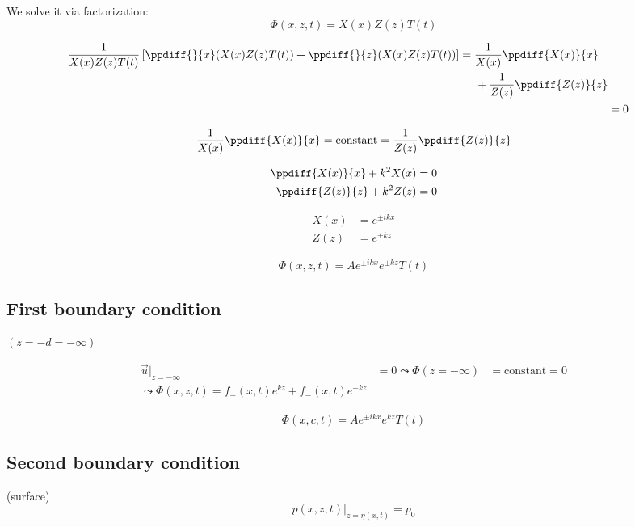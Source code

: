 We solve it via factorization:
\begin{equation}
\Phi(x,z,t)=X(x)Z(z)T(t)
\end{equation}

\begin{align}
\begin{split}
\frac{1}{X(x)Z(z)T(t)}  \left[ \ppdiff{}{x}(X(x)Z(z)T(t)) + \ppdiff{}{z}(X(x)Z(z)T(t))\right] &=  \frac{1}{X(x)}\ppdiff{X(x)}{x} \\
&\hspace{5mm}+\frac{1}{Z(z)}\ppdiff{Z(z)}{z}
\end{split} \\
&= 0
\end{align}

\begin{equation}
\frac{1}{X(x)}\ppdiff{X(x)}{x} = \mathrm{constant} = \frac{1}{Z(z)}\ppdiff{Z(z)}{z}
\end{equation}

\begin{align}
\ppdiff{X(x)}{x}+k^2X(x) &= 0 \\
\ppdiff{Z(z)}{z}+k^2Z(z) &= 0 
\end{align}

\begin{align}
X(x) &= e^{\pm ikx} \\
Z(z) &= e^{\pm kz}
\end{align}

\begin{equation}
\Phi(x,z,t) = Ae^{\pm ikx}e^{\pm kz} T(t)
\end{equation}

\subsection{First boundary condition}
$(z=-d=-\infty)$

\begin{align}
\vec{u}|_{z=-\infty} &= 0
\leadsto
\Phi(z=-\infty)&=\mathrm{constant} =0\\
\leadsto
\Phi(x,z,t) = f_+(x,t)e^{kz}+f_-(x,t)e^{-kz}
\end{align}

\begin{equation}\label{eq:surface-phi}
\Phi(x,c,t) = A e^{\pm ikx} e^{kz} T(t)
\end{equation}

\subsection{Second boundary condition}(surface)
\begin{equation}
p(x,z,t)|_{z=\eta(x,t)} = p_0
\end{equation}


